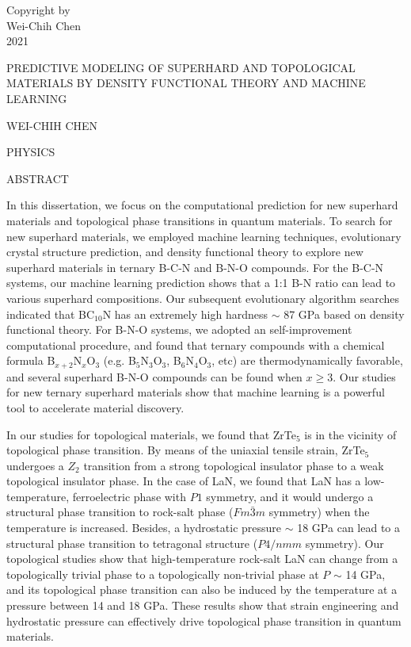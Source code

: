    \begin{singlespace}
	{\centering
		Copyright by\\
		Wei-Chih Chen\\
		2021\par
	}
    \end{singlespace}
	\restoregeometry
	\pagestyle{plain} %
		{\centering
		\singlespacing
			PREDICTIVE MODELING OF SUPERHARD AND TOPOLOGICAL MATERIALS BY DENSITY FUNCTIONAL THEORY AND MACHINE LEARNING\par
		}
		\vskip 12pt
		{\centering
			WEI-CHIH CHEN\par
		}
		\vskip 12pt
		{\centering
			PHYSICS\par
		}
		\vskip 12pt
		{\centering
			ABSTRACT\par
		}
		\vskip 12pt
        In this dissertation, we focus on the computational prediction for new superhard materials and topological phase transitions in quantum materials. To search for new superhard materials, we employed machine learning techniques, evolutionary crystal structure prediction, and density functional theory to explore new superhard materials in ternary B-C-N and B-N-O compounds. For the B-C-N systems, our machine learning prediction shows that a 1:1 B-N ratio can lead to various superhard compositions. Our subsequent evolutionary algorithm searches indicated that BC$_{10}$N has an extremely high hardness $\sim$ 87 GPa based on density functional theory. For B-N-O systems, we adopted an self-improvement computational procedure, and found that ternary compounds with a chemical formula B$_{x+2}$N$_{x}$O$_{3}$ (e.g. B$_5$N$_3$O$_3$, B$_6$N$_4$O$_3$, etc) are thermodynamically favorable, and several superhard B-N-O compounds can be found when $x \geq 3$. Our studies for new ternary superhard materials show that machine learning is a powerful tool to accelerate material discovery.

		In our studies for topological materials, we found that ZrTe$_5$ is in the vicinity of topological phase transition. By means of the uniaxial tensile strain, ZrTe$_5$ undergoes a $Z_2$ transition from a strong topological insulator phase to a weak topological insulator phase. In the case of LaN, we found that LaN has a low-temperature, ferroelectric phase with $P1$ symmetry, and it would undergo a structural phase transition to rock-salt phase ($Fm\bar{3}m$ symmetry) when the temperature is increased. Besides, a hydrostatic pressure $\sim$ 18 GPa can lead to a structural phase transition to tetragonal structure ($P4/nmm$ symmetry). Our topological studies show that high-temperature rock-salt LaN can change from a topologically trivial phase to a topologically non-trivial phase at $P$ $\sim$ 14 GPa, and its topological phase transition can also be induced by the temperature at a pressure between 14 and 18 GPa. These results show that strain engineering and hydrostatic pressure can effectively drive topological phase transition in quantum materials.

